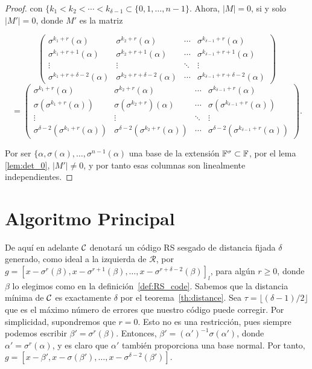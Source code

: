 \begin{proof}
con \(\{k_1 < k_2 < \cdots < k_{\delta-1} \subset \{0, 1, \dots, n-1\}\). Ahora, \(|M| = 0\), si y solo \(|M'| =0\), donde \(M'\) es la matriz

\[
\begin{pmatrix}
    \sigma^{k_1+r}(\alpha) & \sigma^{k_2+r}(\alpha) & \cdots & \sigma^{k_{\delta-1}+r}(\alpha) \\
    \sigma^{k_1+r+1}(\alpha) & \sigma^{k_2+r+1}(\alpha) & \cdots & \sigma^{k_{\delta-1}+r+1}(\alpha) \\
    \vdots & \vdots & \ddots & \vdots \\
    \sigma^{k_1+r+\delta-2}(\alpha) & \sigma^{k_2+r+\delta-2}(\alpha) & \cdots & \sigma^{k_{\delta-1}+r+\delta-2}(\alpha)
\end{pmatrix}
\]
\[
=
\begin{pmatrix}
    \sigma^{k_1+r}(\alpha) & \sigma^{k_2+r}(\alpha) & \cdots & \sigma^{k_{\delta-1}+r}(\alpha) \\
    \sigma(\sigma^{k_1+r}(\alpha)) & \sigma(\sigma^{k_2+r})(\alpha) & \cdots & \sigma(\sigma^{k_{\delta-1}+r}(\alpha)) \\
    \vdots & \vdots & \ddots & \vdots \\
    \sigma^{\delta-2}(\sigma^{k_1+r}(\alpha)) & \sigma^{\delta-2}(\sigma^{k_2+r}(\alpha)) & \cdots & \sigma^{\delta-2}(\sigma^{k_{\delta-1}+r}(\alpha))
\end{pmatrix}
.\]

Por ser \(\{\alpha, \sigma(\alpha), \dots, \sigma^{n-1}(\alpha)\) una base de la extensión \(\mathbb{F}^\sigma \subset \mathbb{F}\), por el lema \ref{lem:det_0}, \(|M'| \neq 0\), y por tanto esas columnas son linealmente independientes.
\end{proof}

\section{Algoritmo Principal}%
\label{sec:algoritmo_principal}

De aquí en adelante \(\mathcal{C}\) denotará un código RS sesgado de distancia fijada \(\delta\) generado, como ideal a la izquierda de  \(\mathcal{R}\), por  \(g = {[x - \sigma^r(\beta), x - \sigma^{r+1}(\beta), \dots, x - \sigma^{r+\delta - 2}(\beta)]}_l\), para algún \(r \geq 0 \), donde \(\beta\) lo elegimos como en la definición~\ref{def:RS_code}. Sabemos que la distancia mínima de \(\mathcal{C}\) es exactamente \(\delta\) por el teorema~\ref{th:distance}. Sea \(\tau = \lfloor (\delta -1)/2 \rfloor\) que es el máximo número de errores que nuestro código puede corregir. Por simplicidad, supondremos que \(r = 0\). Esto no es una restricción, pues siempre podemos escribir  \(\beta' = \sigma^r(\beta)\). Entonces, \(\beta' = {(\alpha')}^{-1} \sigma(\alpha')\), donde \(\alpha' = \sigma^r(\alpha)\), y es claro que \(\alpha'\) también proporciona una base normal. Por tanto, \(g = [x - \beta', x - \sigma(\beta'), \dots, x - \sigma^{\delta - 2}(\beta')]\).

